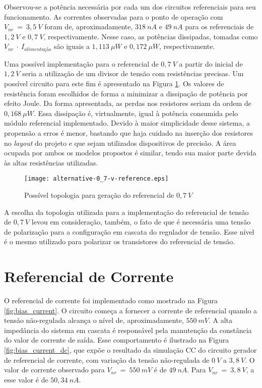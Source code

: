 Observou-se a potência necessária por cada um dos circuitos referenciais para seu funcionamento. As correntes observadas para o ponto de operação com $V_{nr}~=~3,5~V$ foram de, aproximadamente, $318~nA$ e $49~nA$ para os referenciais de $1,2~V$ e $0,7~V$, respectivamente. Nesse caso, as potências dissipadas, tomadas como $V_{nr}~\cdot~I_{alimentação}$ são iguais a $1,113~\mu W$ e $0,172~\mu W$, respectivamente.

Uma possível implementação para o referencial de $0,7~V$ a partir do inicial de $1,2~V$ seria a utilização de um divisor de tensão com resistências precisas. Um possível circuito para este fim é apresentado na Figura \ref{fig:0_7_ref_divider}. Os valores de resistência foram escolhidos de forma a minimizar a dissipação de potência por efeito Joule. Da forma apresentada, as perdas nos resistores seriam da ordem de $0,168~\mu W$. Essa dissipação é, virtualmente, igual à potência consumida pelo módulo referencial implementado. Devido à maior simplicidade desse sistema, a propensão a erros é menor, bastando que haja cuidado na inserção dos resistores no \textit{layout} do projeto e que sejam utilizados dispositivos de precisão. A área ocupada por ambos os modelos propostos é similar, tendo sua maior parte devida às altas resistências utilizadas.

\begin{figure}[!htb]
	\caption{\label{fig:0_7_ref_divider}Possível topologia para geração do referencial de $0,7~V$}
	\begin{center}
		\texttt{[image: alternative-0\_7-v-reference.eps]}
	\end{center}
\end{figure}

A escolha da topologia utilizada para a implementação do referencial de tensão de $0,7~V$ levou em consideração, também, o fato de que é necessária uma tensão de polarização para a configuração em cascata do regulador de tensão. Esse nível é o mesmo utilizado para polarizar os transistores do referencial de tensão.


\section{Referencial de Corrente}
O referencial de corrente foi implementado como mostrado na Figura \ref{fig:bias_current}. O circuito começa a fornecer a corrente de referencial quando a tensão não-regulada alcança o nível de, aproximadamente, $550~mV$. A alta impedância do sistema em cascata é responsável pela manutenção da constância do valor de corrente de saída. Esse comportamento é ilustrado na Figura \ref{fig:bias_current_dc}, que expõe o resultado da simulação {CC} do circuito gerador de referencial de corrente, com variação da tensão não-regulada de $0~V$ a $3,8~V$. O valor de corrente observado para $V_{nr}~=~550~mV$ é de $49~nA$. Para $V_{nr}~=~3,8~V$, a esse valor é de $50,34~nA$.

